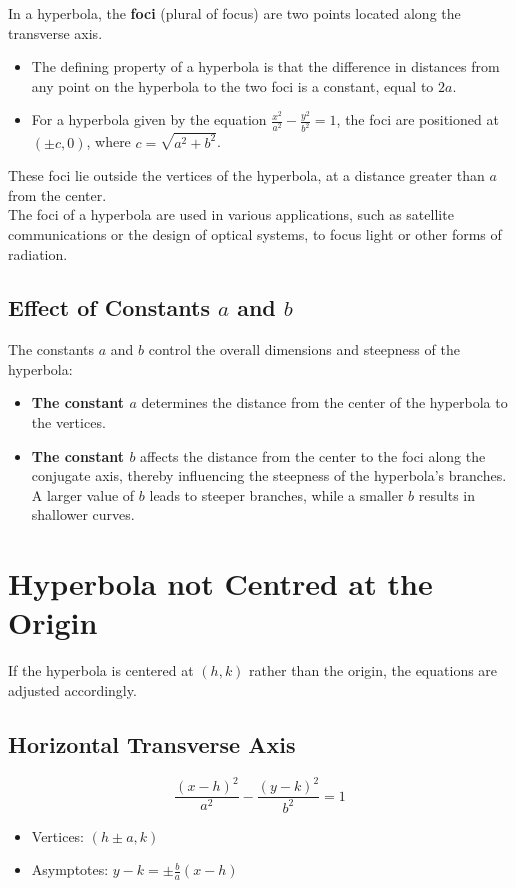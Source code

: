 \documentclass[12pt]{article}
\begin{document}
In a hyperbola, the \textbf{foci} (plural of focus) are two points located along the transverse axis.\\

\begin{itemize}
\item The defining property of a hyperbola is that the difference in distances from any point on the hyperbola to the two foci is a constant, equal to \(2a\).\\
\item For a hyperbola given by the equation $\frac{x^2}{a^2} - \frac{y^2}{b^2} = 1$, the foci are positioned at \((\pm c, 0)\), where \(c = \sqrt{a^2 + b^2}\).\\
\end{itemize}
These foci lie outside the vertices of the hyperbola, at a distance greater than \(a\) from the center.\\
The foci of a hyperbola are used in various applications, such as satellite communications or the design of optical systems, to focus light or other forms of radiation.\\

\subsection*{Effect of Constants $a$ and $b$}
The constants $a$ and $b$ control the overall dimensions and steepness of the hyperbola:\\

\begin{itemize}
\item \textbf{The constant \(a\)} determines the distance from the center of the hyperbola to the vertices.
\item \textbf{The constant \(b\)} affects the distance from the center to the foci along the conjugate axis, thereby influencing the steepness of the hyperbola's branches. A larger value of $b$ leads to steeper branches, while a smaller $b$ results in shallower curves.
\end{itemize}

\newpage

\section*{Hyperbola not Centred at the Origin}
If the hyperbola is centered at \((h, k)\) rather than the origin, the equations are adjusted accordingly.

\subsection*{Horizontal Transverse Axis}
\[
\frac{(x - h)^2}{a^2} - \frac{(y - k)^2}{b^2} = 1
\]
\begin{itemize}
    \item Vertices: \((h \pm a, k)\)
    \item Asymptotes: \( y - k = \pm \frac{b}{a}(x - h) \)
\end{itemize}
\end{document}
